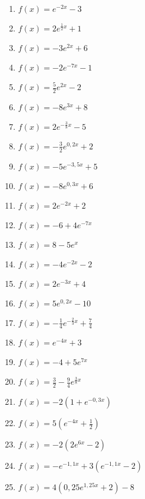 \begin{Exercise}[title={Bestimme den y-Achsenabschnitt, skizziere das Schaubild, gib die Asymptote, das Verhalten für \(x\rightarrow \pm\infty\) und die Monotonie an}, label=eFktA2]
	\begin{minipage}{\textwidth}
		\begin{minipage}{0.5\textwidth}
			\begin{enumerate}[label=\alph*)]
				\item \(f(x)=e^{-2x}-3\)
				\item \(f(x)=2e^{\frac{1}{2}x}+1\)
				\item \(f(x)=-3e^{2x}+6\)
				\item \(f(x)=-2e^{-7x}-1\)
				\item \(f(x)=\frac{5}{2}e^{2x}-2\)
				\item \(f(x)=-8e^{3x}+8\)
				\item \(f(x)=2e^{-\frac{3}{8}x}-5\)
				\item \(f(x)=-\frac{3}{2}e^{0,2x}+2\)
				\item \(f(x)=-5e^{-3,5x}+5\)
				\item \(f(x)=-8e^{0,3x}+6\)
				\item \(f(x)=2e^{-2x}+2\)
				\item \(f(x)=-6+4e^{-7x}\)
				\item \(f(x)=8-5e^{x}\)
			\end{enumerate}
		\end{minipage}%
		\begin{minipage}{0.5\textwidth}
			\begin{enumerate}[label=\alph*)]
				\setcounter{enumi}{13}
				\item \(f(x)=-4e^{-2x}-2\)
				\item \(f(x)=2e^{-3x}+4\)
				\item \(f(x)=5e^{0,2x}-10\)
				\item \(f(x)=-\frac{1}{4}e^{-\frac{2}{3}x}+\frac{7}{4}\)
				\item \(f(x)=e^{-4x}+3\)
				\item \(f(x)=-4+5e^{7x}\)
				\item \(f(x)=\frac{3}{2}-\frac{9}{4}e^{\frac{3}{8}x}\)
				\item \(f(x)=-2\left(1+e^{-0,3x}\right) \)
				\item \(f(x)=5\left(e^{-4x}+\frac{1}{2}\right) \)
				\item \(f(x)=-2\left( 2e^{6x}-2\right) \)
				\item \(f(x)=-e^{-1,1x}+3\left(e^{-1,1x}-2\right)\)
				\item \(f(x)=4\left( 0,25e^{1,25x}+2\right) -8\)
			\end{enumerate}
		\end{minipage}%
	\end{minipage}
\end{Exercise}
